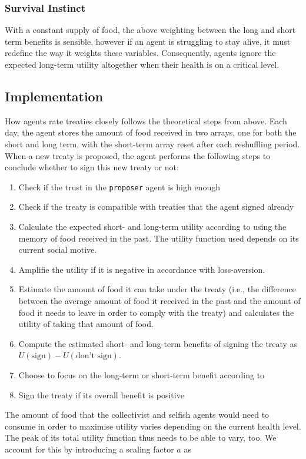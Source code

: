\subsubsection{Survival Instinct}
With a constant supply of food, the above weighting between the long and short term benefits is sensible, however if an agent is struggling to stay alive, it must redefine the way it weights these variables. Consequently, agents ignore the expected long-term utility altogether when their health is on a critical level.
\subsection{Implementation}
How agents rate treaties closely follows the theoretical steps from above. Each day, the agent stores the amount of food received in two arrays, one for both the short and long term, with the short-term array reset after each reshuffling period. When a new treaty is proposed, the agent performs the following steps to conclude whether to sign this new treaty or not:
\begin{enumerate}
    \item Check if the trust in the \texttt{proposer} agent is high enough
    \item Check if the treaty is compatible with treaties that the agent signed already
    \item Calculate the expected short- and long-term utility according to  using the memory of food received in the past. The utility function used depends on its current social motive.
    \item Amplifie the utility if it is negative in accordance with loss-aversion.
    \item Estimate the amount of food it can take under the treaty (i.e., the difference between the average amount of food it received in the past and the amount of food it needs to leave in order to comply with the treaty) and calculates the utility of taking that amount of food.
    \item Compute the estimated short- and long-term benefits of signing the treaty as $U(\text{sign}) - U(\text{don’t sign})$.
    \item Choose to focus on the long-term or short-term benefit according to 
    \item Sign the treaty if its overall benefit is positive
\end{enumerate}
The amount of food that the collectivist and selfish agents would need to consume in order to maximise utility varies depending on the current health level. The peak of its total utility function thus needs to be able to vary, too. We account for this by introducing a scaling factor $a$ as
